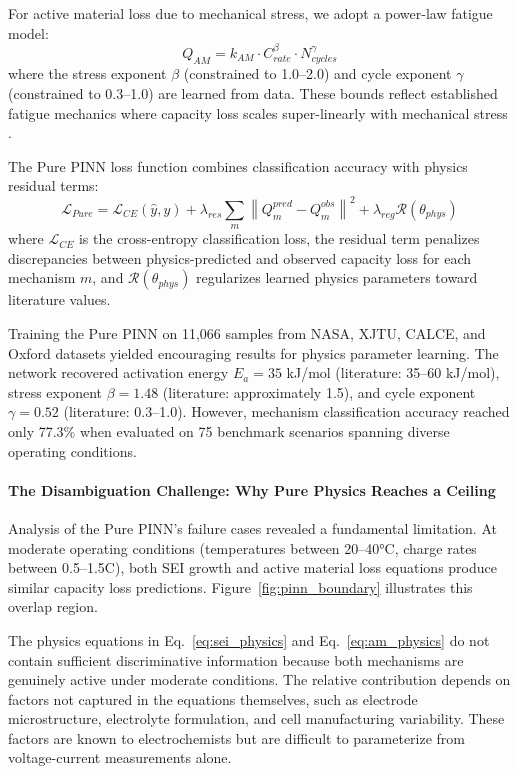 \documentclass[5p,times,authoryear]{elsarticle}
\begin{document}
For active material loss due to mechanical stress, we adopt a power-law fatigue model:
\begin{equation}
Q_{AM} = k_{AM} \cdot C_{rate}^\beta \cdot N_{cycles}^\gamma
\label{eq:am_physics}
\end{equation}
where the stress exponent $\beta$ (constrained to 1.0--2.0) and cycle exponent $\gamma$ (constrained to 0.3--1.0) are learned from data. These bounds reflect established fatigue mechanics where capacity loss scales super-linearly with mechanical stress \citep{zhang2020degradation}.

The Pure PINN loss function combines classification accuracy with physics residual terms:
\begin{equation}
\mathcal{L}_{Pure} = \mathcal{L}_{CE}(\hat{y}, y) + \lambda_{res} \sum_{m} \left\| Q_m^{pred} - Q_m^{obs} \right\|^2 + \lambda_{reg} \mathcal{R}(\theta_{phys})
\label{eq:pure_pinn_loss}
\end{equation}
where $\mathcal{L}_{CE}$ is the cross-entropy classification loss, the residual term penalizes discrepancies between physics-predicted and observed capacity loss for each mechanism $m$, and $\mathcal{R}(\theta_{phys})$ regularizes learned physics parameters toward literature values.

Training the Pure PINN on 11,066 samples from NASA, XJTU, CALCE, and Oxford datasets yielded encouraging results for physics parameter learning. The network recovered activation energy $E_a = 35$ kJ/mol (literature: 35--60 kJ/mol), stress exponent $\beta = 1.48$ (literature: approximately 1.5), and cycle exponent $\gamma = 0.52$ (literature: 0.3--1.0). However, mechanism classification accuracy reached only 77.3\% when evaluated on 75 benchmark scenarios spanning diverse operating conditions.

\paragraph{The Disambiguation Challenge: Why Pure Physics Reaches a Ceiling}

Analysis of the Pure PINN's failure cases revealed a fundamental limitation. At moderate operating conditions (temperatures between 20--40°C, charge rates between 0.5--1.5C), both SEI growth and active material loss equations produce similar capacity loss predictions. Figure~\ref{fig:pinn_boundary} illustrates this overlap region.

The physics equations in Eq.~\ref{eq:sei_physics} and Eq.~\ref{eq:am_physics} do not contain sufficient discriminative information because both mechanisms are genuinely active under moderate conditions. The relative contribution depends on factors not captured in the equations themselves, such as electrode microstructure, electrolyte formulation, and cell manufacturing variability. These factors are known to electrochemists but are difficult to parameterize from voltage-current measurements alone.
\end{document}
